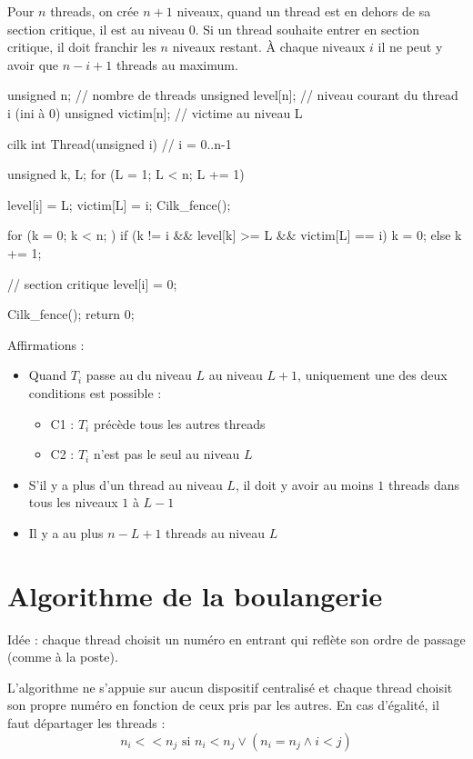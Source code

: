 \documentclass[11pt,a4paper]{report}
\begin{document}
Pour $n$ threads, on crée $n+1$ niveaux, quand un thread est en dehors de sa section critique, il est au niveau $0$. Si un thread souhaite entrer en section critique, il doit franchir les $n$ niveaux restant. \`{A} chaque niveaux $i$ il ne peut y avoir que $n-i+1$ threads au maximum.

\begin{ccode}
    unsigned n;         // nombre de threads
    unsigned level[n];  // niveau courant du thread i (ini à 0)
    unsigned victim[n]; // victime au niveau L

    cilk int Thread(unsigned i) // i = 0..n-1
    { 
        unsigned k, L;
        for (L = 1; L < n; L += 1)
        {
            level[i] = L;
            victim[L] = i;
            Cilk_fence();

            for (k = 0; k < n; )
            {
                if (k != i && level[k] >= L && victim[L] == i)
                    k = 0;
                else
                    k += 1;
            }
        }
        // section critique
        level[i] = 0;

        Cilk_fence();
        return 0;
    } 
\end{ccode}

Affirmations :
\begin{itemize}
    \item Quand $T_i$ passe au du niveau $L$ au niveau $L+1$, uniquement une des deux conditions est possible :
        \begin{itemize}
            \item C1 : $T_i$ précède tous les autres threads
            \item C2 : $T_i$ n'est pas le seul au niveau $L$
        \end{itemize}
    \item S'il y a plus d'un thread au niveau $L$, il doit y avoir au moins $1$ threads dans tous les niveaux $1$ à $L-1$
    \item Il y a au plus $n-L+1$ threads au niveau $L$
\end{itemize}

\section{Algorithme de la boulangerie} %
\label{sec:Algorithme de la boulangerie}

Idée : chaque thread choisit un numéro en entrant qui reflète son ordre de passage (comme à la poste).

L'algorithme ne s'appuie sur aucun dispositif centralisé et chaque thread choisit son propre numéro en fonction de ceux pris par les autres. En cas d'égalité, il faut départager les threads :
$$
n_i << n_j \text{ si } n_i < n_j \vee (n_i = n_j \wedge i < j)
$$
\end{document}
